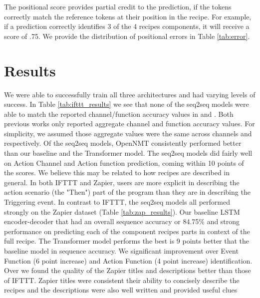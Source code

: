 \documentclass[letterpaper]{article} %
\begin{document}
The positional score provides partial credit to the prediction, if the tokens correctly match the reference tokens at their position in the recipe. For example, if a prediction correctly identifies 3 of the 4 recipes components, it will receive a score of .75. We provide the distribution of positional errors in Table \ref{tab:error}.


\vspace{-3.60mm}
\section{Results}

We were able to successfully train all three architectures and had varying levels of success. In Table \ref{tab:ifttt_results} we see that none of the seq2seq models were able to match the reported channel/function accuracy values in \citeauthor{chen2016latent} \citeyear{chen2016latent} and \citeauthor{beltagy-quirk-2016-improved} \citeyear{beltagy-quirk-2016-improved}. Both previous works only reported aggregate channel and function accuracy values. For simplicity, we assumed those aggregate values were the same across channels and  respectively. Of the seq2seq models, OpenNMT consistently performed better than our baseline and the Transformer model. The seq2seq models did fairly well on Action Channel and Action function prediction, coming within 10 points of the \citeauthor{chen2016latent} \citeyear{chen2016latent} scores. We believe this may be related to how recipes are described in general. In both IFTTT and Zapier, users are more explicit in describing the action scenario (the "Then") part of the program than they are in describing the Triggering event.  In contrast to IFTTT, the seq2seq models all performed strongly on the Zapier dataset (Table \ref{tab:zap_results}). Our baseline LSTM encoder-decoder that had an overall sequence accuracy or 84.75\% and strong performance on predicting each of the component recipes parts in context of the full recipe. The Transformer model performs the best is 9 points better that the baseline model in sequence accuracy. We significant improvement over Event Function (6 point increase) and Action Function (4 point increase) identification. Over we found the quality of the Zapier titles and descriptions better than those of IFTTT. Zapier titles were consistent their ability to concisely describe the recipes and the descriptions were also well written and provided useful clues
\end{document}
